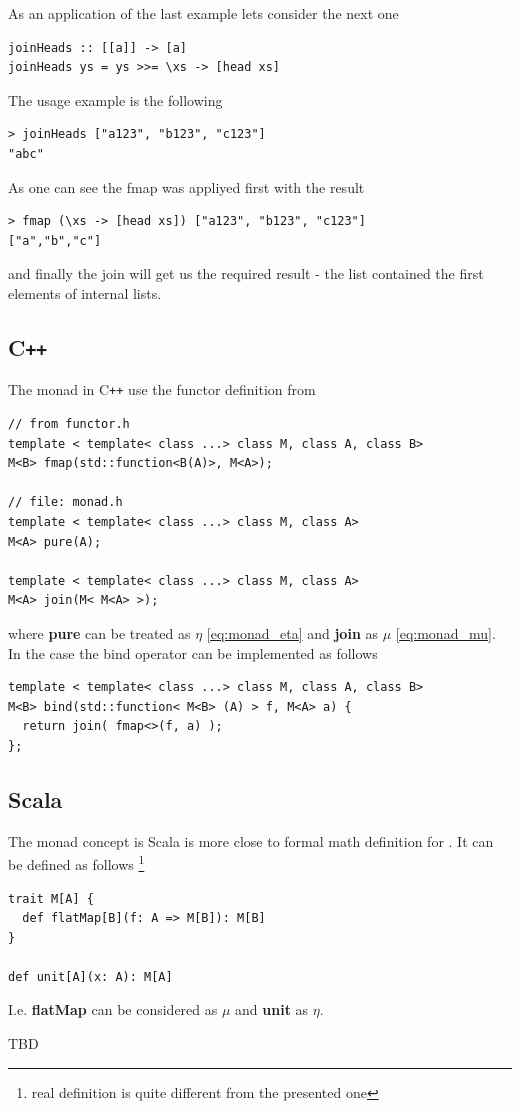 As an application of the last example lets consider the next one

\begin{example}
\begin{verbatim}
joinHeads :: [[a]] -> [a]
joinHeads ys = ys >>= \xs -> [head xs]
\end{verbatim}
The usage example is the following
\begin{verbatim}
> joinHeads ["a123", "b123", "c123"]
"abc"
\end{verbatim}
As one can see the fmap was appliyed first with the result
\begin{verbatim}
> fmap (\xs -> [head xs]) ["a123", "b123", "c123"]
["a","b","c"]
\end{verbatim}
and finally the join will get us the required result - the list
contained the first elements of internal lists. 
\end{example}

\subsection{C\texttt{++}}
The monad in C\texttt{++} use the functor definition from 
\begin{verbatim}
// from functor.h
template < template< class ...> class M, class A, class B> 
M<B> fmap(std::function<B(A)>, M<A>);

// file: monad.h
template < template< class ...> class M, class A> 
M<A> pure(A);

template < template< class ...> class M, class A> 
M<A> join(M< M<A> >);
\end{verbatim}
where \textbf{pure} can be treated as $\eta$
\eqref{eq:monad_eta} and 
\textbf{join} as $\mu$ \eqref{eq:monad_mu}. In the case
the bind operator can be implemented as follows
\begin{verbatim}
template < template< class ...> class M, class A, class B> 
M<B> bind(std::function< M<B> (A) > f, M<A> a) {
  return join( fmap<>(f, a) );
};
\end{verbatim}

\subsection{Scala}

\begin{example}
The monad concept is Scala is more close to formal math definition for
. It can be defined as follows 
\footnote{real definition is quite different from the presented one}
\label{ex:monad_scala}
\begin{verbatim}
trait M[A] {
  def flatMap[B](f: A => M[B]): M[B]
}
  
def unit[A](x: A): M[A]
\end{verbatim} 
I.e. \textbf{flatMap} can be considered as $\mu$ and
\textbf{unit} as $\eta$. 
\end{example}

TBD
